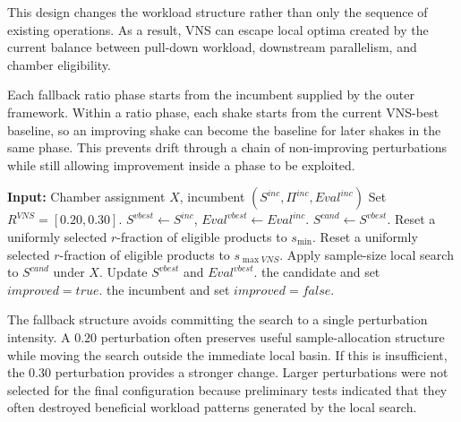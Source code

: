 \documentclass[11pt]{article}
\begin{document}
This design changes the workload structure rather than only the sequence of existing operations. As a result, VNS can escape local optima created by the current balance between pull-down workload, downstream parallelism, and chamber eligibility.

Each fallback ratio phase starts from the incumbent supplied by the outer framework. Within a ratio phase, each shake starts from the current VNS-best baseline, so an improving shake can become the baseline for later shakes in the same phase. This prevents drift through a chain of non-improving perturbations while still allowing improvement inside a phase to be exploited.

\begin{algorithm}[H]
\caption{VNS with fixed fallback ratios}
\label{alg:vns_short}
\begin{algorithmic}[1]
\State \textbf{Input:} Chamber assignment \(X\), incumbent \((S^{inc},\Pi^{inc},Eval^{inc})\)
\State Set \(R^{VNS}=[0.20,0.30]\).
    \State \(S^{vbest}\leftarrow S^{inc}\), \(Eval^{vbest}\leftarrow Eval^{inc}\).
        \State \(S^{cand}\leftarrow S^{vbest}\).
            \State Reset a uniformly selected \(r\)-fraction of eligible products to \(s_{\min}\).
        \Else
            \State Reset a uniformly selected \(r\)-fraction of eligible products to \(s_{\max VNS}\).
        \EndIf
        \State Apply sample-size local search to \(S^{cand}\) under \(X\).
            \State Update \(S^{vbest}\) and \(Eval^{vbest}\).
        \EndIf
            \State \Return the candidate and set \(improved=true\).
        \EndIf
    \EndFor
\EndFor
\State \Return the incumbent and set \(improved=false\).
\end{algorithmic}
\end{algorithm}

The fallback structure avoids committing the search to a single perturbation intensity. A \(0.20\) perturbation often preserves useful sample-allocation structure while moving the search outside the immediate local basin. If this is insufficient, the \(0.30\) perturbation provides a stronger change. Larger perturbations were not selected for the final configuration because preliminary tests indicated that they often destroyed beneficial workload patterns generated by the local search.
\end{document}
